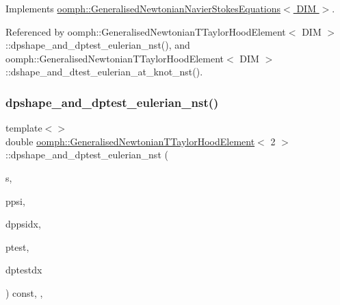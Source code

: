 Implements \hyperlink{classoomph_1_1GeneralisedNewtonianNavierStokesEquations_a00027d27dfdf3c0b72b0d1df9addfdc8}{oomph\+::\+Generalised\+Newtonian\+Navier\+Stokes\+Equations$<$ D\+I\+M $>$}.



Referenced by oomph\+::\+Generalised\+Newtonian\+T\+Taylor\+Hood\+Element$<$ D\+I\+M $>$\+::dpshape\+\_\+and\+\_\+dptest\+\_\+eulerian\+\_\+nst(), and oomph\+::\+Generalised\+Newtonian\+T\+Taylor\+Hood\+Element$<$ D\+I\+M $>$\+::dshape\+\_\+and\+\_\+dtest\+\_\+eulerian\+\_\+at\+\_\+knot\+\_\+nst().

\mbox{\label{classoomph_1_1GeneralisedNewtonianTTaylorHoodElement_a84173694a3d89aa02f6c7839871204b6}} 
\subsubsection{\texorpdfstring{dpshape\+\_\+and\+\_\+dptest\+\_\+eulerian\+\_\+nst()}{dpshape\_and\_dptest\_eulerian\_nst()}\hspace{0.1cm}{\footnotesize\ttfamily [2/3]}}
{\footnotesize\ttfamily template$<$$>$ \\
double \hyperlink{classoomph_1_1GeneralisedNewtonianTTaylorHoodElement}{oomph\+::\+Generalised\+Newtonian\+T\+Taylor\+Hood\+Element}$<$ 2 $>$\+::dpshape\+\_\+and\+\_\+dptest\+\_\+eulerian\+\_\+nst (\begin{DoxyParamCaption}\item[{const \hyperlink{classoomph_1_1Vector}{Vector}$<$ double $>$ \&}]{s,  }\item[{\hyperlink{classoomph_1_1Shape}{Shape} \&}]{ppsi,  }\item[{\hyperlink{classoomph_1_1DShape}{D\+Shape} \&}]{dppsidx,  }\item[{\hyperlink{classoomph_1_1Shape}{Shape} \&}]{ptest,  }\item[{\hyperlink{classoomph_1_1DShape}{D\+Shape} \&}]{dptestdx }\end{DoxyParamCaption}) const\hspace{0.3cm}{\ttfamily [inline]}, {\ttfamily [protected]}, {\ttfamily [virtual]}}

